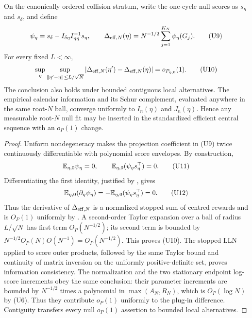 \begin{lemma}
\label{lem:efficient-score-plugin-main}
On the canonically ordered collision stratum, write the one-cycle null scores
as \(s_\eta\) and \(s_\delta\), and define
\[
 \psi_\eta=s_\delta-I_{\delta\eta}I_{\eta\eta}^{-1}s_\eta,
 \qquad
 \Delta_{{\rm eff},N}(\eta)=N^{-1/2}
 \sum_{j=1}^{K_N}\psi_\eta(G_j).
\tag{U9}
\]
For every fixed \(L<\infty\),
\[
 \sup_{\eta}\sup_{\|\eta'-\eta\|\le L/\sqrt N}
 |\Delta_{{\rm eff},N}(\eta')-\Delta_{{\rm eff},N}(\eta)|
 =o_{P_{\eta,0}}(1).
\tag{U10}
\]
The conclusion also holds under bounded contiguous local alternatives.  The
empirical calendar information and its Schur complement, evaluated anywhere
in the same root-\(N\) ball, converge uniformly to \(I_n(\eta)\) and
\(J_n(\eta)\).  Hence any measurable root-\(N\) null fit may be inserted in
the standardized efficient central sequence with an \(o_P(1)\) change.
\end{lemma}

\begin{proof}
Uniform nondegeneracy makes the projection coefficient in \textup{(U9)} twice
continuously differentiable with polynomial score envelopes.  By construction,
\[
 \mathbb{E}_{\eta,0}\psi_\eta=0,
 \qquad \mathbb{E}_{\eta,0}(\psi_\eta s_\eta^\top)=0.
\tag{U11}
\]
Differentiating the first identity, justified by
, gives
\[
 \mathbb{E}_{\eta,0}(\partial_\eta\psi_\eta)
 =-\mathbb{E}_{\eta,0}(\psi_\eta s_\eta^\top)=0.
\tag{U12}
\]
Thus the derivative of \(\Delta_{{\rm eff},N}\) is a normalized stopped sum
of centred rewards and is \(O_P(1)\) uniformly by
.  A second-order Taylor expansion
over a ball of radius \(L/\sqrt N\) has first term \(O_P(N^{-1/2})\); its
second term is bounded by
\(N^{-1/2}O_P(N)O(N^{-1})=O_P(N^{-1/2})\).  This proves \textup{(U10)}.
The stopped LLN applied to score outer products, followed by the same Taylor
bound and continuity of matrix inversion on the uniformly positive-definite
set, proves information consistency.  The normalization and the two
stationary endpoint log-score increments obey the same conclusion: their parameter
increments are bounded by \(N^{-1/2}\) times a polynomial in
\(\max(A_N,R_N)\), which is \(O_P(\log N)\) by \textup{(U6)}.  Thus they
contribute \(o_P(1)\) uniformly to the plug-in difference.  Contiguity
transfers every null \(o_P(1)\) assertion to bounded local alternatives.
\end{proof}

